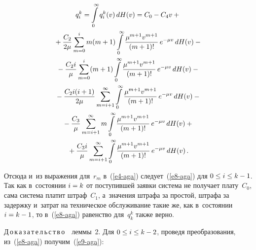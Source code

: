 \begin{multicols}{2}
{  \noindent
  \begin{multline*}
  q_i^k=\int\limits_0^\infty q_i^k(v)\,dH(v)= C_0-C_4v+{}\\
  {}+\displaystyle\frac{\displaystyle C_2\mathstrut}{\displaystyle 2\mu\mathstrut}\sum\limits^i_{m=0} m(m+1) \int\limits_0^\infty 
\displaystyle\frac{\displaystyle \mu^{m+1} v^{m+1}\mathstrut}{\displaystyle (m+1)!\mathstrut}\,e^{-\mu v}\,dH(v)-{}\\
  {}-
  \displaystyle\frac{\displaystyle C_2i\mathstrut}{\displaystyle \mu\mathstrut}\sum\limits^i_{m=0} (m+1) \int\limits_0^\infty \displaystyle\frac{\displaystyle \mu^{m+1} 
v^{m+1}\mathstrut}{\displaystyle (m+1)!\mathstrut}\,e^{-\mu v}\,dH(v)-{}\\
  {}-
  \displaystyle\frac{\displaystyle C_2 i (i+1)\mathstrut}{\displaystyle 2\mu\mathstrut} \sum\limits^\infty_{m=i+1} \int\limits_0^\infty 
\displaystyle\frac{\displaystyle \mu^{m+1} v^{m+1}\mathstrut}{\displaystyle (m+1)!\mathstrut}\,e^{-\mu v}\,dH(v)-{}\\
  {}-
  \displaystyle\frac{\displaystyle C_3\mathstrut}{\displaystyle \mu\mathstrut}\sum\limits^\infty_{m=i+1} m \int\limits_0^\infty  \displaystyle\frac{\displaystyle \mu^{m+1} 
v^{m+1}\mathstrut}{\displaystyle (m+1)!\mathstrut}\,e^{-\mu v}\,dH(v) +{}\\
{}+
  \displaystyle\frac{\displaystyle C_3 i\mathstrut}{\displaystyle \mu\mathstrut} \sum\limits^\infty_{m=i+1} \int\limits_0^\infty \displaystyle\frac{\displaystyle \mu^{m+1} 
v^{m+1}\mathstrut}{\displaystyle (m+1)!\mathstrut}\,e^{-\mu v}\,dH(v)\,.
  \end{multline*}
  
 
  
  \noindent
   Отсюда и~из выражения для~$r_m$ в~(\ref{e4-aga}) следует~(\ref{e8-aga}) 
для $0\hm\leq i\hm\leq k\hm-1$. Так как в~состоянии $i\hm=k$ от поступившей 
заявки система не получает плату~$C_0$, сама система платит штраф~$C_1$, 
а~значения штрафа за простой, штрафа за задержку и~затрат на техническое 
обслуживание такие же, как в~состоянии $i\hm= k\hm-1$, то в~(\ref{e8-aga}) 
равенство для~$q_k^k$ также верно. 
  
  \vspace{2pt}
  
  \noindent
  Д\,о\,к\,а\,з\,а\,т\,е\,л\,ь\,с\,т\,в\,о\ \ леммы~2. Для $0\hm\leq i\hm\leq 
k\hm-2$, проведя преобразования, из~(\ref{e8-aga}) получим~(\ref{e9-aga}):

\vspace*{-6pt}

}
\end{multicols}
